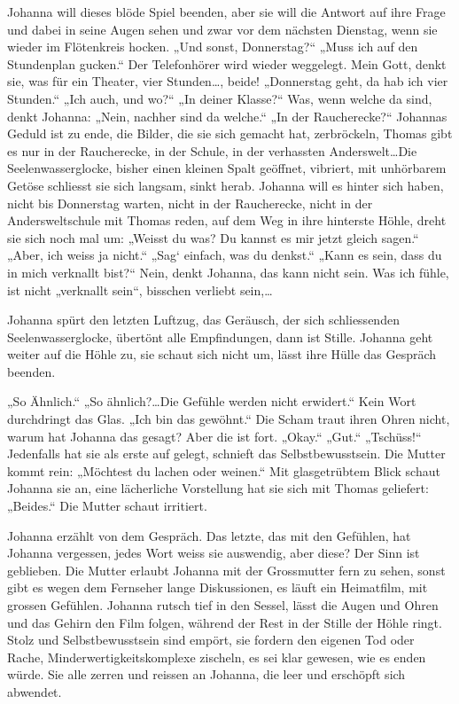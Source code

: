 \documentclass[10pt,titlepage,a5paper]{book}
\begin{document}
Johanna will dieses blöde Spiel beenden, aber sie will die Antwort auf ihre Frage und dabei in seine Augen sehen und zwar vor dem nächsten Dienstag, wenn sie wieder im Flötenkreis hocken. „Und sonst, Donnerstag?“ „Muss ich auf den Stundenplan gucken.“ Der Telefonhörer wird wieder weggelegt. Mein Gott, denkt sie, was für ein Theater, vier Stunden\dots , beide! „Donnerstag geht, da hab ich vier Stunden.“ „Ich auch, und wo?“ „In deiner Klasse?“ Was, wenn welche da sind, denkt Johanna: „Nein, nachher sind da welche.“ „In der Raucherecke?“ Johannas Geduld ist zu ende, die Bilder, die sie sich gemacht hat, zerbröckeln, Thomas gibt es nur in der Raucherecke, in der Schule, in der verhassten Anderswelt\dots  Die Seelenwasserglocke, bisher einen kleinen Spalt geöffnet, vibriert, mit unhörbarem Getöse schliesst sie sich langsam, sinkt herab. Johanna will es hinter sich haben, nicht bis Donnerstag warten, nicht in der Raucherecke, nicht in der Andersweltschule mit Thomas reden, auf dem Weg in ihre hinterste Höhle, dreht sie sich noch mal um: „Weisst du was? Du kannst es mir jetzt gleich sagen.“ „Aber, ich weiss ja nicht.“ „Sag` einfach, was du denkst.“ „Kann es sein, dass du in mich verknallt bist?“ Nein, denkt Johanna, das kann nicht sein. Was ich fühle, ist nicht „verknallt sein“, bisschen verliebt sein,\dots 

Johanna spürt den letzten Luftzug, das Geräusch, der sich schliessenden Seelenwasserglocke, übertönt alle Empfindungen, dann ist Stille. Johanna geht weiter auf die Höhle zu, sie schaut sich nicht um, lässt ihre Hülle das Gespräch beenden.

„So Ähnlich.“ „So ähnlich?\dots  Die Gefühle werden nicht erwidert.“ 
Kein Wort durchdringt das Glas. „Ich bin das gewöhnt.“ Die Scham traut ihren Ohren nicht, warum hat Johanna das gesagt? Aber die ist fort. „Okay.“ „Gut.“ „Tschüss!“ Jedenfalls hat sie als erste auf gelegt, schnieft das Selbstbewusstsein.
Die Mutter kommt rein: „Möch\-test du lachen oder weinen.“ Mit glasgetrübtem Blick schaut  Johanna sie an, eine lächerliche Vorstellung hat sie sich mit Thomas geliefert: „Beides.“ Die Mutter schaut irritiert.

 Johanna erzählt von dem Gespräch. Das letzte, das mit den Ge\-fühlen, hat Johanna vergessen, jedes Wort weiss sie auswendig, aber diese? Der Sinn ist geblieben.
Die Mutter erlaubt Johanna mit der Grossmutter fern zu sehen, sonst gibt es wegen dem Fernseher lange Diskussionen, es läuft ein Heimatfilm, mit grossen Gefühlen. Johanna rutsch tief in den Sessel, lässt die Augen und Ohren und das Gehirn den Film folgen, während der Rest in der Stille  der Höhle ringt. Stolz und Selbstbewusstsein sind empört, sie fordern den eigenen Tod oder Rache, Minderwertigkeitskomplexe zischeln, es sei klar gewesen, wie es enden würde. Sie alle zerren und reissen an Johanna, die leer und erschöpft sich abwendet.
\end{document}
